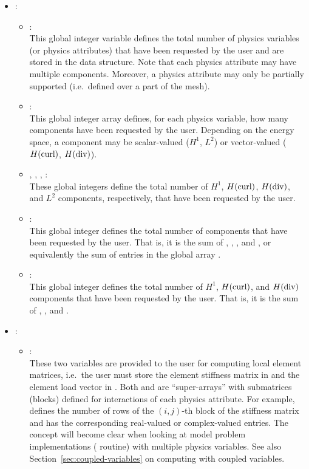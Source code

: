\begin{itemize}
	\item
	{
		 : 
		\begin{itemize}
			\item{ :\\
			This global integer variable defines the total number of physics variables (or physics attributes) that have been requested by the user and are stored in the data structure. Note that each physics attribute may have multiple components. Moreover, a physics attribute may only be partially supported (i.e.~defined over a part of the mesh).
			} \item{ :\\
			This global integer array defines, for each physics variable, how many components have been requested by the user. Depending on the energy space, a component may be scalar-valued ($H^1$, $L^2$) or vector-valued ($H(\text{curl})$, $H(\text{div})$).
			} \item{ , , , :\\
			These global integers define the total number of $H^1$, $H(\text{curl})$, $H(\text{div})$, and $L^2$ components, respectively, that have been requested by the user.
			} \item{ :\\
			This global integer defines the total number of components that have been requested by the user. That is, it is the sum of , , , and , or equivalently the sum of entries in the global array .
			} \item{ :\\
			This global integer defines the total number of $H^1$, $H(\text{curl})$, and $H(\text{div})$ components that have been requested by the user. That is, it is the sum of , , and .
			}
		\end{itemize}
	}
	\item
	{
		 :
		\begin{itemize}
			\item{ : \\
			These two variables are provided to the user for computing local element matrices, i.e.~the user must store the element stiffness matrix in  and the element load vector in . Both  and  are ``super-arrays'' with submatrices (blocks) defined for interactions of each physics attribute. For example,  defines the number of rows of the $(i,j)$-th block of the stiffness matrix and  has the corresponding real-valued or complex-valued entries. The concept will become clear when looking at model problem implementations ( routine) with multiple physics variables. See also Section~\ref{sec:coupled-variables} on computing with coupled variables.
}
\end{itemize}}
\end{itemize}
